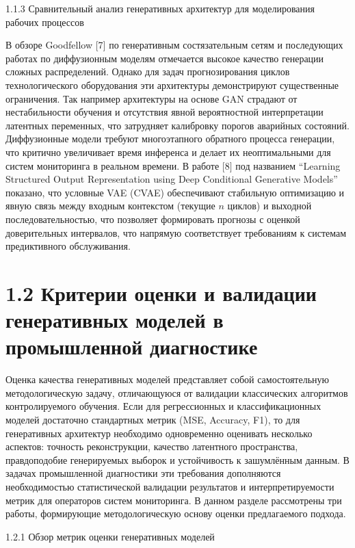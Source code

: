 \documentclass[14pt, a4paper, oneside]{extreport}
\begin{document}
\clearpage
{1.1.3 Сравнительный анализ генеративных архитектур для моделирования рабочих процессов}
\vspace{1em}

В обзоре Goodfellow $[$7$]$ по генеративным состязательным сетям и последующих работах по диффузионным моделям отмечается высокое качество генерации сложных распределений. Однако для задач прогнозирования циклов технологического оборудования эти архитектуры демонстрируют существенные ограничения. Так например архитектуры на основе GAN страдают от нестабильности обучения и отсутствия явной вероятностной интерпретации латентных переменных, что затрудняет калибровку порогов аварийных состояний. Диффузионные модели требуют многоэтапного обратного процесса генерации, что критично увеличивает время инференса и делает их неоптимальными для систем мониторинга в реальном времени.
В работе $[$8$]$ под названием “Learning Structured Output Representation using Deep Conditional Generative Models” показано, что условные VAE (CVAE) обеспечивают стабильную оптимизацию и явную связь между входным контекстом (текущие $n$ циклов) и выходной последовательностью, что позволяет формировать прогнозы с оценкой доверительных интервалов, что напрямую соответствует требованиям к системам предиктивного обслуживания.

\vspace{1em}
\section{1.2 Критерии оценки и валидации генеративных моделей в промышленной диагностике}
\vspace{1em}
Оценка качества генеративных моделей представляет собой самостоятельную методологическую задачу, отличающуюся от валидации классических алгоритмов контролируемого обучения. Если для регрессионных и классификационных моделей достаточно стандартных метрик (MSE, Accuracy, F1), то для генеративных архитектур необходимо одновременно оценивать несколько аспектов: точность реконструкции, качество латентного пространства, правдоподобие генерируемых выборок и устойчивость к зашумлённым данным. В задачах промышленной диагностики эти требования дополняются необходимостью статистической валидации результатов и интерпретируемости метрик для операторов систем мониторинга. В данном разделе рассмотрены три работы, формирующие методологическую основу оценки предлагаемого подхода.

\vspace{1em}
{1.2.1 Обзор метрик оценки генеративных моделей}
\vspace{1em}
\end{document}
